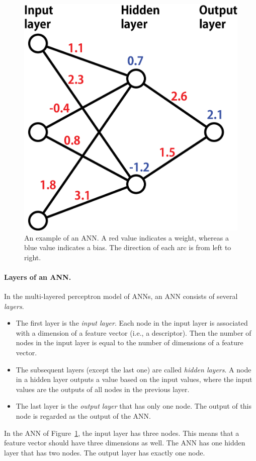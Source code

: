 \documentclass[11pt,titlepage,dvipdfmx,twoside]{book}
\newcommand{\figref}[1]{Figure~\ref{fig:#1}}
\begin{document}
\begin{figure}[h!]
  \centering
  \includegraphics[width = 0.5 \textwidth]{./fig/ANN_sample_en}
  \caption{An example of an ANN.
    A red value indicates a weight, whereas
    a blue value indicates a bias.
    The direction of each arc is from left to right.}
  \label{fig:sample}
\end{figure}

\paragraph{Layers of an ANN.}
In the multi-layered perceptron model of ANNs,
an ANN consists of several \emph{layers}.
%
\begin{itemize}
  \item 
  The first layer is the {\em input layer}.
    Each node in the input layer is associated with a dimension of
    a feature vector (i.e., a descriptor). 
    Then the number of nodes in the input layer
    is equal to the number of dimensions of a feature vector. 
    
  \item 
  The subsequent layers (except the last one) are called
    {\em hidden layers}. A node in a hidden layer outputs a value
    based on the input values, where the input values
    are the outputs of all nodes in the previous layer.
    
  \item 
  The last layer is the {\em output layer} that has only one node.
    The output of this node is regarded as the output of the ANN. 
\end{itemize}

In the ANN of \figref{sample}, the input layer has three nodes.
This means that a feature vector should have three dimensions as well.
The ANN has one hidden layer that has two nodes.
The output layer has exactly one node. 
\end{document}
